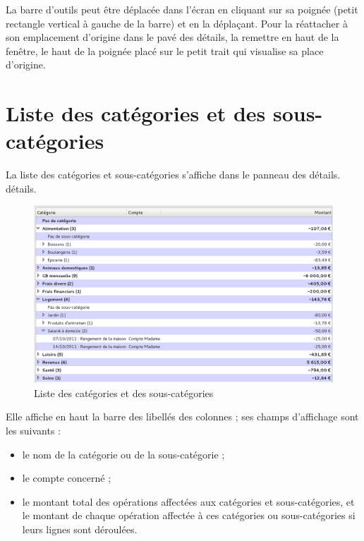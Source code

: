 La barre d'outils peut être déplacée dans l'écran en cliquant sur sa poignée (petit rectangle vertical à gauche de la barre) et en la déplaçant. Pour la réattacher à son emplacement d'origine dans le pavé des détails, la remettre en haut de la fenêtre, le haut de la poignée placé sur le petit trait qui visualise sa place d'origine.


\section{Liste des catégories et des sous-catégories\label{categories-list}}


La liste des catégories et sous-catégories s'affiche dans le panneau des \ifIllustration détails.
\else détails.
\fi

\ifIllustration
\begin{figure}[htbp]
\begin{center}
\includegraphics[scale=0.5]{image/screenshot/categories_list.png}
\end{center}
\caption{Liste des catégories et des sous-catégories}
\label{categories-list-img}
\end{figure}
\fi

Elle affiche en haut la barre des libellés des colonnes ; ses champs d'affichage sont les suivants :
\begin{itemize}
	 \item le nom de la catégorie ou de la sous-catégorie ;
	 \item le compte concerné ;
	 \item le montant total des opérations affectées aux  catégories et sous-catégories, et le montant de chaque opération affectée à ces catégories ou sous-catégories si leurs lignes sont déroulées.
\end{itemize}

